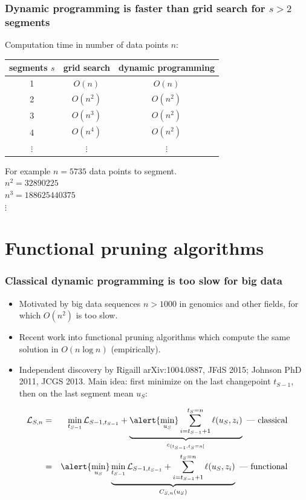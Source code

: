 \documentclass{beamer}
\begin{document}






\begin{frame}
  \frametitle{Dynamic programming is faster than grid search for $s>
    2$ segments}

  Computation time in number of data points $n$:

  \vskip 1cm

  \begin{tabular}{ccc}
    segments $s$ & grid search & dynamic programming \\
    \hline
    1 & $O(n)$ & $O(n)$ \\
    2 & $O(n^2)$ & $O(n^2)$ \\
    3 & $O(n^3)$ & $O(n^2)$ \\
    4 & $O(n^4)$ & $O(n^2)$ \\
    $\vdots$ &     $\vdots$ &     $\vdots$ 
  \end{tabular}

  \vskip 1cm

  For example $n = 5735$ data points to segment.\\
  $n^2 = 32890225$\\
  $n^3 = 188625440375$\\
  $\vdots$
\end{frame}



\section{Functional pruning algorithms}

\begin{frame}
  \frametitle{Classical dynamic programming is too slow for big data}
  \begin{itemize}
  \item Motivated by big data sequences $n>1000$ in genomics and other
    fields, for which $O(n^2)$ is too slow.
  \item Recent work into functional pruning algorithms which compute
    the same solution in $O(n\log n)$ (empirically).
  \item Independent discovery by Rigaill arXiv:1004.0887, JFdS 2015;
    Johnson PhD 2011, JCGS 2013. Main idea: first minimize on the last
    changepoint $t_{S-1}$, then on the last segment mean $u_S$:
  \end{itemize}
\begin{eqnarray*}
  \mathcal L_{S,n} &=& \min_{t_{S-1}}
\mathcal L_{S-1, t_{S-1}}
 +
\underbrace{\alert{\min_{u_S}} \sum_{i=t_{S-1}+1}^{t_S=n} \ell( u_S,  z_i)}_{
c_{(t_{S-1}, t_S=n]}
}\text{ --- classical}\\
&=& \alert{\min_{u_S} }
\underbrace{
\min_{t_{S-1}}
\mathcal L_{S-1, t_{S-1}}
 +
\sum_{i=t_{S-1}+1}^{t_S=n} \ell( u_S,  z_i)
}_{
C_{S,n}(u_S)
}\text{ --- functional}
\end{eqnarray*}
\end{frame}
\end{document}
